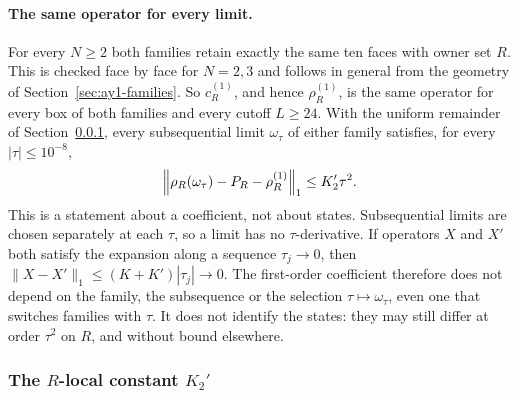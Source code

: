 \paragraph{The same operator for every limit.}
For every $N\ge2$ both families retain exactly the same ten faces with owner
set $R$. This is checked face by face for $N=2,3$ and follows in general from
the geometry of Section~\ref{sec:ay1-families}. So $c^{(1)}_R$, and hence
$\rho^{(1)}_R$, is the same operator for every box of both families and every
cutoff $L\ge24$. With the uniform remainder of Section~\ref{sec:ay1-k2},
every subsequential limit $\omega_\tau$ of either family satisfies, for every
$|\tau|\le10^{-8}$,
\begin{equation}
 \left\lVert\rho_R(\omega_\tau)-P_R-\rho^{(1)}_R\right\rVert_1\le K_2'\tau^2 .
 \label{eq:ay1-expansion}
\end{equation}
This is a statement about a coefficient, not about states. Subsequential
limits are chosen separately at each $\tau$, so a limit has no
$\tau$-derivative. If operators $X$ and $X'$ both satisfy the expansion along
a sequence $\tau_j\to0$, then $\lVert X-X'\rVert_1\le(K+K')|\tau_j|\to0$. The
first-order coefficient therefore does not depend on the family, the
subsequence or the selection $\tau\mapsto\omega_\tau$, even one that switches
families with $\tau$. It does not identify the states: they may still differ
at order $\tau^2$ on $R$, and without bound elsewhere.

\subsubsection{The \texorpdfstring{$R$}{R}-local constant \texorpdfstring{$K_2'$}{K2'}}
\label{sec:ay1-k2}
